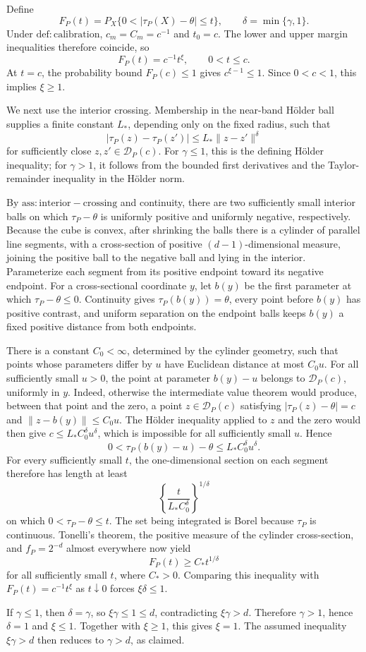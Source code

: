 Define
\[
F_P(t)=P_X\{0<|\tau_P(X)-\theta|\le t\},
\qquad
\delta=\min\{\gamma,1\}.
\]
Under \(\mathrm{def:calibration}\), \(c_m=C_m=c^{-1}\) and \(t_0=c\). The lower and upper margin inequalities therefore coincide, so
\[
F_P(t)=c^{-1}t^\xi,
\qquad 0<t\le c.
\]
At \(t=c\), the probability bound \(F_P(c)\le1\) gives \(c^{\xi-1}\le1\). Since \(0<c<1\), this implies \(\xi\ge1\).

We next use the interior crossing. Membership in the near-band Hölder ball supplies a finite constant \(L_*\), depending only on the fixed radius, such that
\[
|\tau_P(z)-\tau_P(z')|\le L_*\|z-z'\|^\delta
\]
for sufficiently close \(z,z'\in\mathcal D_P(c)\). For \(\gamma\le1\), this is the defining Hölder inequality; for \(\gamma>1\), it follows from the bounded first derivatives and the Taylor-remainder inequality in the Hölder norm.

By \(\mathrm{ass:interior-crossing}\) and continuity, there are two sufficiently small interior balls on which \(\tau_P-\theta\) is uniformly positive and uniformly negative, respectively. Because the cube is convex, after shrinking the balls there is a cylinder of parallel line segments, with a cross-section of positive \((d-1)\)-dimensional measure, joining the positive ball to the negative ball and lying in the interior. Parameterize each segment from its positive endpoint toward its negative endpoint. For a cross-sectional coordinate \(y\), let \(b(y)\) be the first parameter at which \(\tau_P-\theta\le0\). Continuity gives \(\tau_P(b(y))=\theta\), every point before \(b(y)\) has positive contrast, and uniform separation on the endpoint balls keeps \(b(y)\) a fixed positive distance from both endpoints.

There is a constant \(C_0<\infty\), determined by the cylinder geometry, such that points whose parameters differ by \(u\) have Euclidean distance at most \(C_0u\). For all sufficiently small \(u>0\), the point at parameter \(b(y)-u\) belongs to \(\mathcal D_P(c)\), uniformly in \(y\). Indeed, otherwise the intermediate value theorem would produce, between that point and the zero, a point \(z\in\mathcal D_P(c)\) satisfying \(|\tau_P(z)-\theta|=c\) and \(\|z-b(y)\|\le C_0u\). The Hölder inequality applied to \(z\) and the zero would then give \(c\le L_*C_0^\delta u^\delta\), which is impossible for all sufficiently small \(u\). Hence
\[
0<\tau_P(b(y)-u)-\theta\le L_*C_0^\delta u^\delta.
\]
For every sufficiently small \(t\), the one-dimensional section on each segment therefore has length at least
\[
\left\{\frac{t}{L_*C_0^\delta}\right\}^{1/\delta}
\]
on which \(0<\tau_P-\theta\le t\). The set being integrated is Borel because \(\tau_P\) is continuous. Tonelli's theorem, the positive measure of the cylinder cross-section, and \(f_P=2^{-d}\) almost everywhere now yield
\[
F_P(t)\ge C_*t^{1/\delta}
\]
for all sufficiently small \(t\), where \(C_*>0\). Comparing this inequality with \(F_P(t)=c^{-1}t^\xi\) as \(t\downarrow0\) forces \(\xi\delta\le1\).

If \(\gamma\le1\), then \(\delta=\gamma\), so \(\xi\gamma\le1\le d\), contradicting \(\xi\gamma>d\). Therefore \(\gamma>1\), hence \(\delta=1\) and \(\xi\le1\). Together with \(\xi\ge1\), this gives \(\xi=1\). The assumed inequality \(\xi\gamma>d\) then reduces to \(\gamma>d\), as claimed.